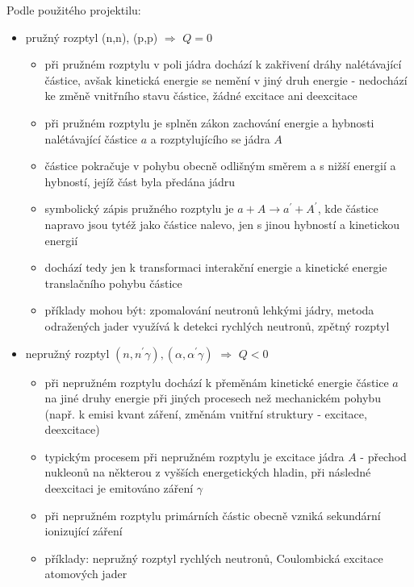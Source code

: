 \documentclass[../../main.tex]{subfiles}
\begin{document}
Podle použitého projektilu:
\begin{itemize}
	\item pružný rozptyl (n,n), (p,p) $\Rightarrow$ $Q = 0$
	\begin{itemize}
		\item při pružném rozptylu v poli jádra dochází k zakřivení dráhy nalétávající částice, avšak kinetická energie se nemění v jiný druh energie - nedochází ke změně vnitřního stavu částice, žádné excitace ani deexcitace
		
		\item při pružném rozptylu je splněn zákon zachování energie a hybnosti nalétávající částice $a$ a rozptylujícího se jádra $A$
		
		\item částice pokračuje v pohybu obecně odlišným směrem a s nižší energií a hybností, jejíž část byla předána jádru
		
		\item symbolický zápis pružného rozptylu je $a+A \rightarrow a^{'}+ A^{'}$, kde částice napravo jsou tytéž jako částice nalevo, jen s jinou hybností a kinetickou energií
		
		\item dochází tedy jen k transformaci interakční energie a kinetické energie translačního pohybu částice 
		
		\item příklady mohou být: zpomalování neutronů lehkými jádry, metoda odražených jader využívá k detekci rychlých neutronů, zpětný rozptyl
	\end{itemize}	
	\item nepružný rozptyl $(n, n^{'} \gamma), (\alpha, \alpha^{'} \gamma)$ $\Rightarrow$ $Q <0$
	\begin{itemize}
		\item při nepružném rozptylu dochází k přeměnám kinetické energie částice $a$ na jiné druhy energie při jiných procesech než mechanickém pohybu (např. k emisi kvant záření, změnám vnitřní struktury - excitace, deexcitace)
		
		\item typickým procesem při nepružném rozptylu je excitace jádra $A$ - přechod nukleonů na některou z vyšších energetických hladin, při následné deexcitaci je emitováno záření $\gamma$
		
		\item při nepružném rozptylu primárních částic obecně vzniká sekundární ionizující záření
		
		\item příklady: nepružný rozptyl rychlých neutronů, Coulombická excitace atomových jader
	\end{itemize}
	

\end{itemize}
\end{document}
